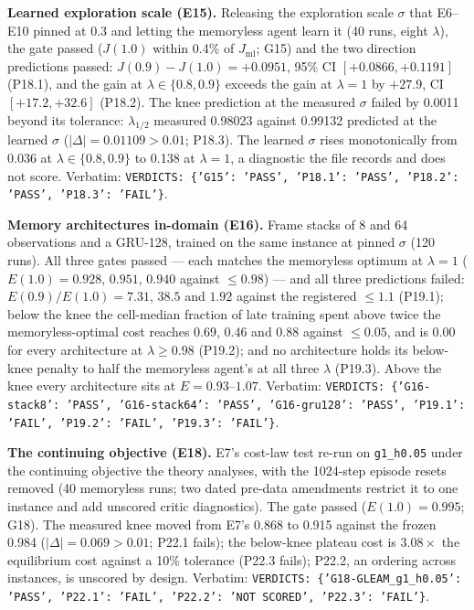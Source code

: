 \textbf{Learned exploration scale (E15).} Releasing the exploration scale
$\sigma$ that E6--E10 pinned at $0.3$ and letting the memoryless agent learn
it (40 runs, eight $\lambda$), the gate passed ($J(1.0)$ within 0.4\% of
$J_{\mathrm{ml}}$; G15) and the two direction predictions passed:
$J(0.9)-J(1.0) = +0.0951$, 95\% CI $[+0.0866, +0.1191]$ (P18.1), and the gain
at $\lambda\in\{0.8, 0.9\}$ exceeds the gain at $\lambda=1$ by $+27.9$, CI
$[+17.2, +32.6]$ (P18.2). The knee prediction at the measured $\sigma$ failed
by 0.0011 beyond its tolerance: $\lambda_{1/2}$ measured 0.98023 against
0.99132 predicted at the learned $\sigma$ ($|\Delta| = 0.01109 > 0.01$;
P18.3). The learned $\sigma$ rises monotonically from 0.036 at
$\lambda\in\{0.8, 0.9\}$ to 0.138 at $\lambda=1$, a diagnostic the file
records and does not score. Verbatim: \texttt{VERDICTS: \{'G15': 'PASS', 'P18.1': 'PASS', 'P18.2': 'PASS', 'P18.3': 'FAIL'\}}.

\textbf{Memory architectures in-domain (E16).} Frame stacks of 8 and 64
observations and a GRU-128, trained on the same instance at pinned $\sigma$
(120 runs). All three gates passed --- each matches the memoryless optimum at
$\lambda=1$ ($E(1.0) = 0.928$, $0.951$, $0.940$ against $\le 0.98$) --- and
all three predictions failed: $E(0.9)/E(1.0) = 7.31$, $38.5$ and $1.92$
against the registered $\le 1.1$ (P19.1); below the knee the cell-median
fraction of late training spent above twice the memoryless-optimal cost
reaches 0.69, 0.46 and 0.88 against $\le 0.05$, and is 0.00 for every
architecture at $\lambda\ge0.98$ (P19.2); and no architecture holds its
below-knee penalty to half the memoryless agent's at all three $\lambda$
(P19.3). Above the knee every architecture sits at $E = 0.93$--$1.07$.
Verbatim: \texttt{VERDICTS: \{'G16-stack8': 'PASS', 'G16-stack64': 'PASS', 'G16-gru128': 'PASS', 'P19.1': 'FAIL', 'P19.2': 'FAIL', 'P19.3': 'FAIL'\}}.

\textbf{The continuing objective (E18).} E7's cost-law test re-run on
\texttt{g1\_h0.05} under the continuing objective the theory analyses, with the
1024-step episode resets removed (40 memoryless runs; two dated pre-data
amendments restrict it to one instance and add unscored critic diagnostics).
The gate passed ($E(1.0) = 0.995$; G18). The measured knee moved from E7's
0.868 to 0.915 against the frozen 0.984 ($|\Delta| = 0.069 > 0.01$; P22.1
fails); the below-knee plateau cost is $3.08\times$ the equilibrium cost
against a 10\% tolerance (P22.3 fails); P22.2, an ordering across instances,
is unscored by design. Verbatim: \texttt{VERDICTS: \{'G18-GLEAM\_g1\_h0.05': 'PASS', 'P22.1': 'FAIL', 'P22.2': 'NOT SCORED', 'P22.3': 'FAIL'\}}.

